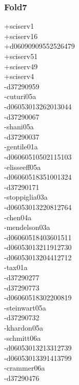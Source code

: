 \begin{multicols}{4}
\subsubsection*{Fold7}
+sciserv1\\
+sciserv16\\
+d06090909552526479\\
+sciserv51\\
+sciserv49\\
+sciserv4\\
-d37290959\\
-cuturi05a\\
-d06053013262013044\\
-d37290067\\
-shani05a\\
-d37290037\\
-gentile01a\\
-d06060510502115103\\
-elisseeff05a\\
-d06060518351001324\\
-d37290171\\
-stoppiglia03a\\
-d06053013220812764\\
-chen04a\\
-mendelson03a\\
-d06060518403601511\\
-d06053013211912730\\
-d06053013204412712\\
-tax01a\\
-d37290277\\
-d37290773\\
-d06060518302200819\\
-steinwart05a\\
-d37290732\\
-khardon05a\\
-schmitt06a\\
-d06053013213312739\\
-d06053013391413799\\
-crammer06a\\
-d37290476\\

\end{multicols}
